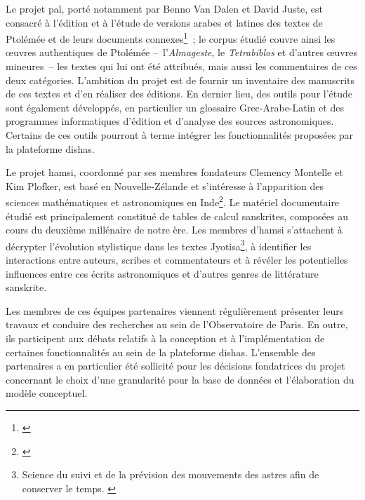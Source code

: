 \documentclass[a4paper,12pt,twoside]{book}
\newcommand{\dishas}{\gls{dishas}\xspace}
\newcommand{\hamsi}{\gls{hamsi}\xspace}
\newcommand{\pal}{\gls{pal}\xspace}
\begin{document}
Le projet \pal, porté notamment par Benno Van Dalen et David Juste, est consacré à l'édition et à l'étude de versions arabes et latines des textes de Ptolémée et de leurs documents connexes\footnote{\cite{PtolemaeusArabusLatinus}}~; le corpus étudié couvre ainsi les œuvres authentiques de Ptolémée –~l'\emph{Almageste}, le \emph{Tetrabiblos} et d'autres œuvres mineures~– les textes qui lui ont été attribués, mais aussi les commentaires de ces deux catégories. L'ambition du projet est de fournir un inventaire des manuscrits de ces textes et d'en réaliser des éditions. En dernier lieu, des outils pour l'étude sont également développés, en particulier un glossaire Grec-Arabe-Latin et des programmes informatiques d'édition et d'analyse des sources astronomiques. Certains de ces outils pourront à terme intégrer les fonctionnalités proposées par la plateforme \dishas.

Le projet \hamsi, coordonné par ses membres fondateurs Clemency Montelle et Kim Plofker, est basé en Nouvelle-Zélande et s'intéresse à l'apparition des sciences mathématiques et astronomiques en Inde\footnote{\cite{HistoryAstronomicalSciences}}. Le matériel documentaire étudié est principalement constitué de tables de calcul sanskrites, composées au cours du deuxième millénaire de notre ère. Les membres d'\hamsi s'attachent à décrypter l'évolution stylistique dans les textes Jyotisa\footnote{Science du suivi et de la prévision des mouvements des astres afin de conserver le temps. \cite[p.~353]{monier-williamsSanskritEnglishDictionary1872}}, à identifier les interactions entre auteurs, scribes et commentateurs et à révéler les potentielles influences entre ces écrits astronomiques et d'autres genres de littérature sanskrite.

Les membres de ces équipes partenaires viennent régulièrement présenter leurs travaux et conduire des recherches au sein de l'Observatoire de Paris. En outre, ils participent aux débats relatifs à la conception et à l'implémentation de certaines fonctionnalités au sein de la plateforme \dishas. L'ensemble des partenaires a en particulier été sollicité pour les décisions fondatrices du projet concernant le choix d'une granularité pour la base de données et l'élaboration du modèle conceptuel.
\end{document}
